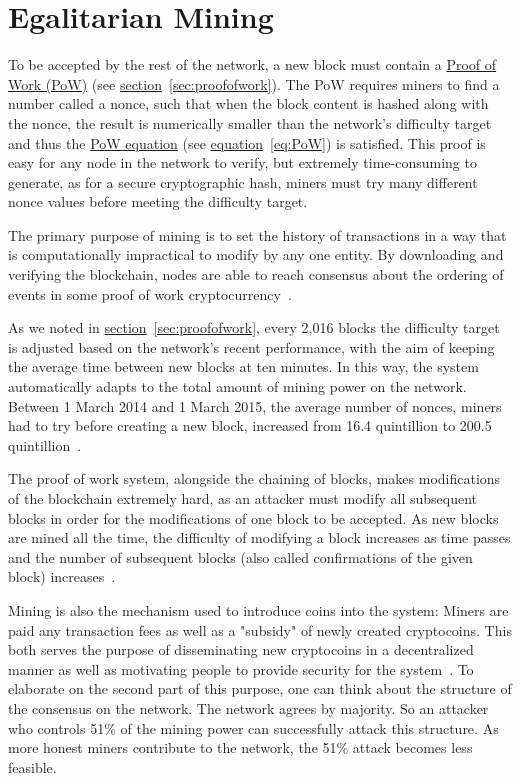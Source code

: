 \section{Egalitarian Mining} \label{sec:mining}


To be accepted by the rest of the network, a new block must contain a \hyperref[sec:proofofwork]{Proof of Work (PoW)} (see \hyperref[sec:proofofwork]{section}~\ref{sec:proofofwork}). The PoW requires miners to find a number called a nonce, such that when the block content is hashed along with the nonce, the result is numerically smaller than the network's difficulty target~\cite{Nakamoto_bitcoin:a} and thus the \hyperref[eq:PoW]{PoW equation} (see \hyperref[eq:PoW]{equation}~\ref{eq:PoW}) is satisfied. This proof is easy for any node in the network to verify, but extremely time-consuming to generate, as for a secure cryptographic hash, miners must try many different nonce values before meeting the difficulty target.

The primary purpose of mining is to set the history of transactions in a way that is computationally impractical to modify by any one entity. By downloading and verifying the blockchain, nodes are able to reach consensus about the ordering of events in some proof of work cryptocurrency~\cite{wiki}.

As we noted in \hyperref[sec:proofofwork]{section}~\ref{sec:proofofwork}, every 2,016 blocks the difficulty target is adjusted based on the network's recent performance, with the aim of keeping the average time between new blocks at ten minutes. In this way, the system automatically adapts to the total amount of mining power on the network. Between 1 March 2014 and 1 March 2015, the average number of nonces, miners had to try before creating a new block, increased from 16.4 quintillion to 200.5 quintillion~\cite{difficulty_history}.

The proof of work system, alongside the chaining of blocks, makes modifications of the blockchain extremely hard, as an attacker must modify all subsequent blocks in order for the modifications of one block to be accepted. As new blocks are mined all the time, the difficulty of modifying a block increases as time passes and the number of subsequent blocks (also called confirmations of the given block) increases~\cite{economist}.

Mining is also the mechanism used to introduce coins into the system: Miners are paid any transaction fees as well as a "subsidy" of newly created cryptocoins. This both serves the purpose of disseminating new cryptocoins in a decentralized manner as well as motivating people to provide security for the system~\cite{wiki}. To elaborate on the second part of this purpose, one can think about the structure of the consensus on the network. The network agrees by majority. So an attacker who controls 51\% of the mining power can successfully attack this structure. As more honest miners contribute to the network, the 51\% attack becomes less feasible.


